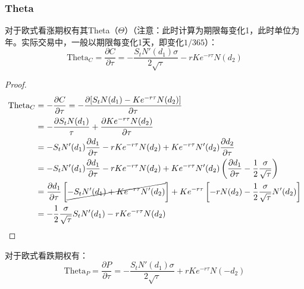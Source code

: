 \documentclass[11pt]{article}
\begin{document}
\subsubsection{Theta}

对于欧式看涨期权有其Theta（$\Theta$）（注意：此时计算为期限每变化1，此时单位为年。实际交易中，一般以期限每变化1天，即变化$1/365$）：
\begin{equation*}
    \text{Theta}_C = \frac{\partial C}{\partial \tau} = -\frac{S_t N'(d_1)\sigma}{2\sqrt{\tau}} - r K e^{-r\tau}N(d_2)
\end{equation*}

\begin{proof}
\begin{align*}
    \text{Theta}_C &= -\frac{\partial C}{\partial \tau} = - \frac{\partial [S_t N(d_1) - Ke^{-r\tau} N(d_2)]}{\partial \tau} \\ 
    &= -\frac{\partial S_t N(d_1)}{\tau} + \frac{\partial Ke^{-r\tau} N(d_2)}{\partial \tau} \\ 
    &= -S_t N'(d_1)\frac{\partial d_1}{\partial \tau} - rKe^{-r\tau}N(d_2) + Ke^{-r\tau} N'(d_2)\frac{\partial d_2}{\partial \tau} \\
    &= -S_t N'(d_1)\frac{\partial d_1}{\partial \tau} - rKe^{-r\tau} N(d_2) + Ke^{-r\tau}N'(d_2)\left(\frac{\partial d_1}{\partial \tau} -\frac{1}{2}\frac{\sigma}{\sqrt{\tau}} \right) \\
    &= \frac{\partial d_1}{\partial \tau} \left[\cancel{-S_t N'(d_1) + Ke^{-r\tau} N'(d_2) } \right] + Ke^{-r\tau} \left[ -rN(d_2) -\frac{1}{2}\frac{\sigma}{\sqrt{\tau}} N'(d_2)\right] \\
    &=  -\frac{1}{2}\frac{\sigma}{\sqrt{\tau}}S_t N'(d_1) - rKe^{-r\tau} N(d_2)
\end{align*}
\end{proof}

对于欧式看跌期权有：
\begin{equation*}
    \text{Theta}_P = \frac{\partial P}{\partial \tau} = -\frac{S_t N'(d_1)\sigma}{2\sqrt{\tau}} + r K e^{-r\tau}N(-d_2)
\end{equation*}
\end{document}

